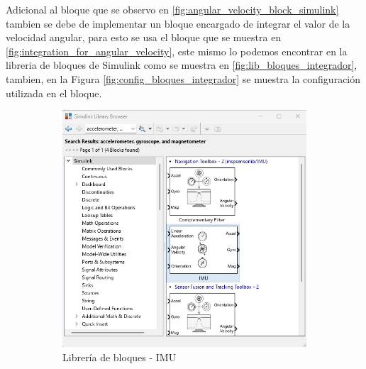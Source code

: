 Adicional al bloque que se observo en \ref{fig:angular_velocity_block_simulink} tambien se debe de implementar un bloque encargado de integrar el valor de la velocidad angular, para esto se usa el bloque que se muestra en \ref{fig:integration_for_angular_velocity}, este mismo lo podemos encontrar en la libreria de bloques de Simulink como se muestra en \ref{fig:lib_bloques_integrador}, tambien, en la Figura \ref{fig:config_bloques_integrador} se muestra la configuración utilizada en el bloque.

\begin{figure}[htbp]
    \centering
    \begin{subfigure}[b]{0.35\textwidth}
        \centering
        \includegraphics[width=\textwidth]{fig/Capitulo5/Caso_de_estudio_IMU/Generador_de_archivos/libreria_de_bloques_IMU.png}
        \caption{Librería de bloques - IMU}
        \label{fig:lib_bloques_IMU}
    \end{subfigure}
    \hfill
    \begin{subfigure}[b]{0.45\textwidth}
        \centering

\end{subfigure}
\end{figure}

